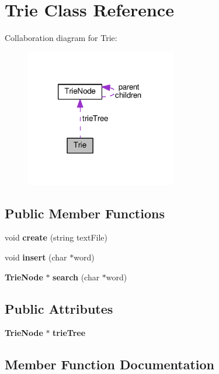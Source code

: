 \section{Trie Class Reference}
\label{class_trie}


Collaboration diagram for Trie\-:\nopagebreak
\begin{figure}[H]
\begin{center}
\leavevmode
\includegraphics[width=187pt]{class_trie__coll__graph}
\end{center}
\end{figure}
\subsection*{Public Member Functions}
\begin{DoxyCompactItemize}
\item 
void {\bf create} (string text\-File)
\item 
void {\bf insert} (char $\ast$word)
\item 
{\bf Trie\-Node} $\ast$ {\bf search} (char $\ast$word)
\end{DoxyCompactItemize}
\subsection*{Public Attributes}
\begin{DoxyCompactItemize}
\item 
{\bf Trie\-Node} $\ast$ {\bf trie\-Tree}
\end{DoxyCompactItemize}


\subsection{Member Function Documentation}
